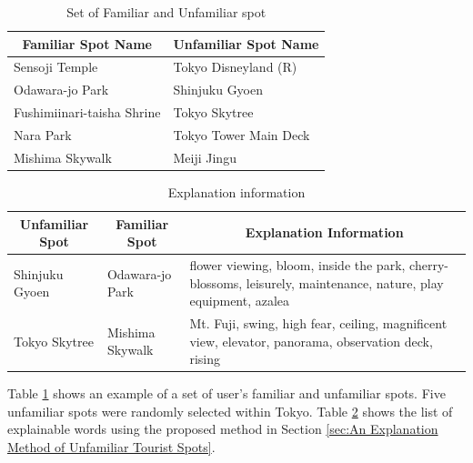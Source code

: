 \documentclass[journal]{IAENGtran}
\begin{document}
\begin{table}[t]
  \caption{Set of Familiar and Unfamiliar spot}
  \label{table:Set of Familiar and Unfamiliar spot}
  \centering
  \begin{tabular}{l|l}
  \hline
  \multicolumn{1}{c|}{Familiar Spot Name} & \multicolumn{1}{c}{Unfamiliar Spot Name} \\ \hline
  Sensoji Temple                          & Tokyo Disneyland (R)                     \\
  Odawara-jo Park                         & Shinjuku Gyoen                           \\
  Fushimiinari-taisha Shrine              & Tokyo Skytree                            \\
  Nara Park                               & Tokyo Tower Main Deck            \\
  Mishima Skywalk                         & Meiji Jingu                              \\ \hline
  \end{tabular}
\end{table}

\begin{table}[t]
  \caption{Explanation information}
  \label{table:Explanation information}
  \centering
  \begin{tabular}{l|l|l}
  \hline
  \multicolumn{1}{c|}{Unfamiliar Spot} & \multicolumn{1}{c|}{Familiar Spot} & \multicolumn{1}{c}{Explanation Information}                     \\ \hline
  Shinjuku Gyoen                      & Odawara-jo Park                         & flower viewing, bloom, inside the park, cherry-blossoms, leisurely, maintenance, nature, play equipment, azalea          \\
  Tokyo Skytree                     & Mishima Skywalk                    & Mt. Fuji, swing, high fear, ceiling, magnificent view, elevator, panorama, observation deck, rising
 \\ \hline
  \end{tabular}
\end{table}

Table \ref{table:Set of Familiar and Unfamiliar spot} shows an example of a set of user's familiar and unfamiliar spots.
Five unfamiliar spots were randomly selected within Tokyo.
Table \ref{table:Explanation information} shows the list of explainable words using the proposed method in Section \ref{sec:An Explanation Method of Unfamiliar Tourist Spots}.
\end{document}
